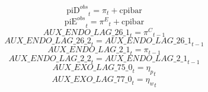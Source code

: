\begin{dmath}
{{\mathrm{piD}^{obs}}}_{t}={{\pi}}_{t}+{{\mathrm{cpibar}}}
\end{dmath}
\begin{dmath}
{{\mathrm{piE}^{obs}}}_{t}={{\pi^{E}}}_{t}+{{\mathrm{cpibar}}}
\end{dmath}
\begin{dmath}
{AUX\_ENDO\_LAG\_26\_1}_{t}={{\pi^{C}}}_{t-1}
\end{dmath}
\begin{dmath}
{AUX\_ENDO\_LAG\_26\_2}_{t}={AUX\_ENDO\_LAG\_26\_1}_{t-1}
\end{dmath}
\begin{dmath}
{AUX\_ENDO\_LAG\_2\_1}_{t}={{\pi}}_{t-1}
\end{dmath}
\begin{dmath}
{AUX\_ENDO\_LAG\_2\_2}_{t}={AUX\_ENDO\_LAG\_2\_1}_{t-1}
\end{dmath}
\begin{dmath}
{AUX\_EXO\_LAG\_75\_0}_{t}={{\eta_{p}}}_{t}
\end{dmath}
\begin{dmath}
{AUX\_EXO\_LAG\_77\_0}_{t}={{\eta_{w}}}_{t}
\end{dmath}
